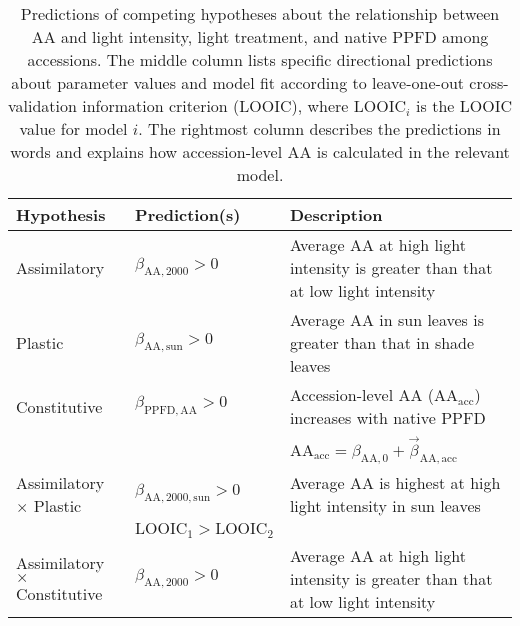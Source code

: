 \documentclass[
  letterpaper,
  DIV=11,
  numbers=noendperiod]{scrartcl}
\newcommand{\aax}{$\mathrm{AA}$}
\newcommand{\ppfd}{$\mathrm{PPFD}$}
\begin{document}
\begin{longtable}{>{\raggedright\arraybackslash}p{1in}>{\raggedright\arraybackslash}p{1.5in}>{\raggedright\arraybackslash}p{3in}}

\caption{\label{tbl-predictions}Predictions of competing hypotheses
about the relationship between \aax{} and light intensity, light
treatment, and native \ppfd{} among accessions. The middle column lists
specific directional predictions about parameter values and model fit
according to leave-one-out cross-validation information criterion
(LOOIC), where \(\text{LOOIC}_i\) is the LOOIC value for model \(i\).
The rightmost column describes the predictions in words and explains how
accession-level \aax{} is calculated in the relevant model.}

\tabularnewline

\toprule
\textbf{Hypothesis} & \textbf{Prediction(s)} & \textbf{Description}\\
\midrule
Assimilatory & $\beta_{\mathrm{AA},2000} > 0$ & \hspace{-1em}Average \aax{} at high light intensity is greater than that at low light intensity\\
\cmidrule{1-3}\pagebreak[0]
Plastic & $\beta_{\mathrm{AA},\text{sun}} > 0$ & \hspace{-1em}Average \aax{} in sun leaves is greater than that in shade leaves\\
\cmidrule{1-3}\pagebreak[0]
Constitutive & $\beta_{\mathrm{PPFD,AA}} > 0$ & \hspace{-1em}Accession-level \aax{} ($\mathrm{AA}_\text{acc}$) increases with native \ppfd\\
\nopagebreak
 &  & \hspace{-1em}$\mathrm{AA}_\text{acc} = \beta_{\mathrm{AA}, 0} + \vec{\beta}_{\mathrm{AA}, \text{acc}}$\\
\cmidrule{1-3}\pagebreak[0]
Assimilatory $\times$ Plastic & $\beta_{\mathrm{AA},2000,\text{sun}} > 0$ & \hspace{-1em}Average \aax{} is highest at high light intensity in sun leaves\\
\nopagebreak
 & $\text{LOOIC}_\text{1} > \text{LOOIC}_\text{2}$ & \hspace{-1em}\\
\cmidrule{1-3}\pagebreak[0]
Assimilatory $\times$ Constitutive & $\beta_{\mathrm{AA},2000} > 0$ & \hspace{-1em}Average \aax{} at high light intensity is greater than that at low light intensity\\

\end{longtable}
\end{document}
